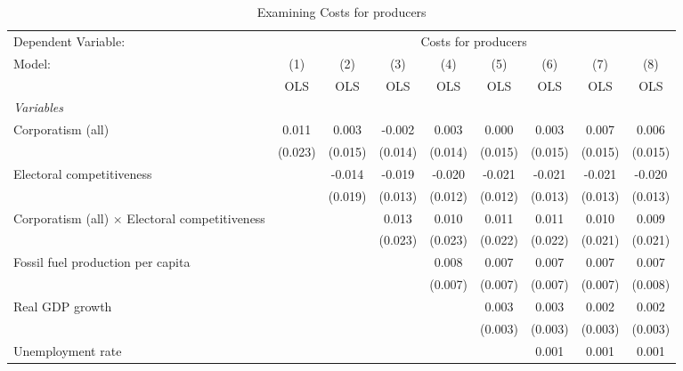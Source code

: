 
\begin{table}[htbp]
   \caption{Examining Costs for producers}
   \centering
   \begin{tabular}{lcccccccc}
      \toprule
      Dependent Variable: & \multicolumn{8}{c}{Costs for producers}\\
      Model:                                                & (1)     & (2)     & (3)     & (4)     & (5)     & (6)     & (7)     & (8)\\  
                                                            &  OLS    & OLS     & OLS     & OLS     & OLS     & OLS     & OLS     & OLS\\  
      \midrule
      \emph{Variables}\\
      Corporatism (all)                                     & 0.011   & 0.003   & -0.002  & 0.003   & 0.000   & 0.003   & 0.007   & 0.006\\   
                                                            & (0.023) & (0.015) & (0.014) & (0.014) & (0.015) & (0.015) & (0.015) & (0.015)\\   
      Electoral competitiveness                             &         & -0.014  & -0.019  & -0.020  & -0.021  & -0.021  & -0.021  & -0.020\\   
                                                            &         & (0.019) & (0.013) & (0.012) & (0.012) & (0.013) & (0.013) & (0.013)\\   
      Corporatism (all) $\times$ Electoral competitiveness  &         &         & 0.013   & 0.010   & 0.011   & 0.011   & 0.010   & 0.009\\   
                                                            &         &         & (0.023) & (0.023) & (0.022) & (0.022) & (0.021) & (0.021)\\   
      Fossil fuel production per capita                     &         &         &         & 0.008   & 0.007   & 0.007   & 0.007   & 0.007\\   
                                                            &         &         &         & (0.007) & (0.007) & (0.007) & (0.007) & (0.008)\\   
      Real GDP growth                                       &         &         &         &         & 0.003   & 0.003   & 0.002   & 0.002\\   
                                                            &         &         &         &         & (0.003) & (0.003) & (0.003) & (0.003)\\   
      Unemployment rate                                     &         &         &         &         &         & 0.001   & 0.001   & 0.001\\   

\end{tabular}
\end{table}
